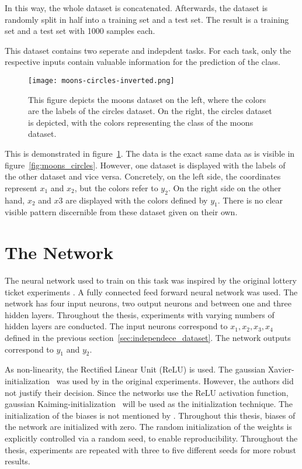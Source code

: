 In this way, the whole dataset is concatenated.
Afterwards, the dataset is randomly split in half into a training set and a test set.
The result is a training set and a test set with 1000 samples each.

This dataset contains two seperate and indepdent tasks.
For each task, only the respective inputs contain valuable information for the prediction of the class.

\begin{figure}[ht]
    \centering
    \texttt{[image: moons-circles-inverted.png]}
    \caption{
        This figure depicts the moons dataset on the left, where the colors are the labels of the circles dataset.
        On the right, the circles dataset is depicted, with the colors representing the class of the moons dataset.
    }\label{fig:moons_circles_inverted}
\end{figure}

This is demonstrated in figure~\ref{fig:moons_circles_inverted}.
The data is the exact same data as is visible in figure~\ref{fig:moons_circles}. 
However, one dataset is displayed with the labels of the other dataset and vice versa.
Concretely, on the left side, the coordinates represent $x_1$ and $x_2$, but the colors refer to $y_2$.
On the right side on the other hand, $x_2$ and $x3$ are displayed with the colors defined by $y_1$.
There is no clear visible pattern discernible from these dataset given on their own.

\section{The Network}
The neural network used to train on this task was inspired by the original lottery ticket experiments \autocite{DBLP:conf/iclr/FrankleC19}. 
A fully connected feed forward neural network was used.
The network has four input neurons, two output neurons and between one and three hidden layers.
Throughout the thesis, experiments with varying numbers of hidden layers are conducted.
The input neurons correspond to $x_1, x_2, x_3, x_4$ defined in the previous section~\ref{sec:independece_dataset}.
The network outputs correspond to $y_1$ and $y_2$.

As non-linearity, the Rectified Linear Unit (ReLU) is used.
The gaussian Xavier-initialization~\textcite{XAVIER-GLOROT} was used by \textcite{DBLP:conf/iclr/FrankleC19} in the original experiments.
However, the authors did not justify their decision.
Since the networks use the ReLU activation function, gaussian Kaiming-initialization~\autocite{KAIMING-HE} will be used as the initialization technique.
The initialization of the biases is not mentioned by \textcite{DBLP:conf/iclr/FrankleC19}.
Throughout this thesis, biases of the network are initialized with zero.
The random initialization of the weights is explicitly controlled via a random seed, to enable reproducibility.
Throughout the thesis, experiments are repeated with three to five different seeds for more robust results.


